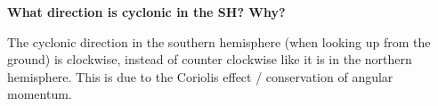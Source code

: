 \textbf{What direction is cyclonic in the SH? Why?}

The cyclonic direction in the southern hemisphere (when looking up from
the ground) is clockwise, instead
of counter clockwise like it is in the northern hemisphere. This is due
to the Coriolis effect / conservation of angular momentum.
